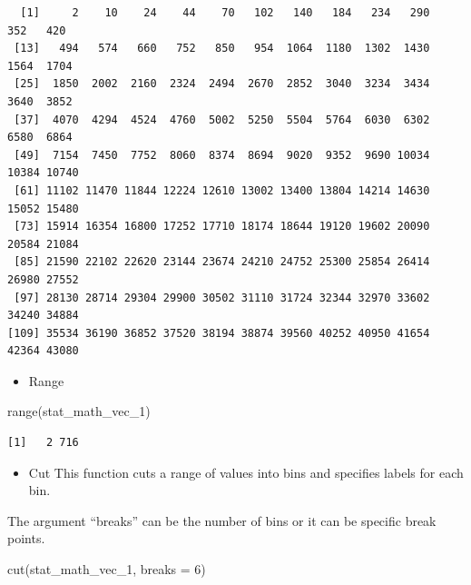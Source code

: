 \documentclass[
  letterpaper,
  DIV=11,
  numbers=noendperiod]{scrreprt}
\newenvironment{Shaded}{\begin{snugshade}}{\end{snugshade}}
\newcommand{\AttributeTok}[1]{\textcolor[rgb]{0.40,0.45,0.13}{#1}}
\newcommand{\DecValTok}[1]{\textcolor[rgb]{0.68,0.00,0.00}{#1}}
\newcommand{\FunctionTok}[1]{\textcolor[rgb]{0.28,0.35,0.67}{#1}}
\newcommand{\NormalTok}[1]{\textcolor[rgb]{0.00,0.23,0.31}{#1}}
\providecommand{\tightlist}{%
  \setlength{\itemsep}{0pt}\setlength{\parskip}{0pt}}\usepackage{longtable,booktabs,array}
\begin{document}
\begin{verbatim}
  [1]     2    10    24    44    70   102   140   184   234   290   352   420
 [13]   494   574   660   752   850   954  1064  1180  1302  1430  1564  1704
 [25]  1850  2002  2160  2324  2494  2670  2852  3040  3234  3434  3640  3852
 [37]  4070  4294  4524  4760  5002  5250  5504  5764  6030  6302  6580  6864
 [49]  7154  7450  7752  8060  8374  8694  9020  9352  9690 10034 10384 10740
 [61] 11102 11470 11844 12224 12610 13002 13400 13804 14214 14630 15052 15480
 [73] 15914 16354 16800 17252 17710 18174 18644 19120 19602 20090 20584 21084
 [85] 21590 22102 22620 23144 23674 24210 24752 25300 25854 26414 26980 27552
 [97] 28130 28714 29304 29900 30502 31110 31724 32344 32970 33602 34240 34884
[109] 35534 36190 36852 37520 38194 38874 39560 40252 40950 41654 42364 43080
\end{verbatim}

\begin{itemize}
\tightlist
\item
  Range
\end{itemize}

\begin{Shaded}
\begin{Highlighting}[]
\FunctionTok{range}\NormalTok{(stat\_math\_vec\_1)}
\end{Highlighting}
\end{Shaded}

\begin{verbatim}
[1]   2 716
\end{verbatim}

\begin{itemize}
\tightlist
\item
  Cut This function cuts a range of values into bins and specifies
  labels for each bin.
\end{itemize}

The argument ``breaks'' can be the number of bins or it can be specific
break points.

\begin{Shaded}
\begin{Highlighting}[]
\FunctionTok{cut}\NormalTok{(stat\_math\_vec\_1, }\AttributeTok{breaks =} \DecValTok{6}\NormalTok{)}
\end{Highlighting}
\end{Shaded}
\end{document}
